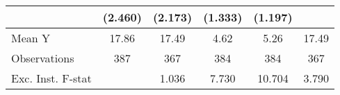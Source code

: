 {\begin{tabular}{l*{5}{c}}
            &     (2.460)         &     (2.173)         &     (1.333)         &     (1.197)         &                     \\
\midrule
Mean Y      &       17.86         &       17.49         &        4.62         &        5.26         &       17.49         \\
Observations&         387         &         367         &         384         &         384         &         367         \\
Exc. Inst. F-stat&                     &       1.036         &       7.730         &      10.704         &       3.790         \\
\bottomrule
\end{tabular}
}
